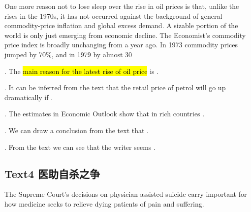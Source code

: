 One more reason not to lose sleep over the rise in oil prices is that, unlike the rises in the 1970s, it has not occurred against the background of general commodity-price inflation and global excess demand. A sizable portion of the world is only just emerging from economic decline. The Economist’s commodity price index is broadly unchanging from a year ago. In 1973 commodity prices jumped by 70\%, and in 1979 by almost 30%

\begin{questions} 
.	The \hl{main reason for the latest rise of oil price} is \ltk{}.\\

.	It can be inferred from the text that the retail price of petrol will go up dramatically if \ltk{}.\\

.	The estimates in Economic Outlook show that in rich countries \ltk{}.\\

.	We can draw a conclusion from the text that \ltk{}.\\

.	From the text we can see that the writer seems \ltk{}.\\
\end{questions}

\subsection{Text4 医助自杀之争}
The Supreme Court’s decisions on physician-assisted suicide carry important 
 for how medicine seeks to relieve dying patients of pain and suffering.


